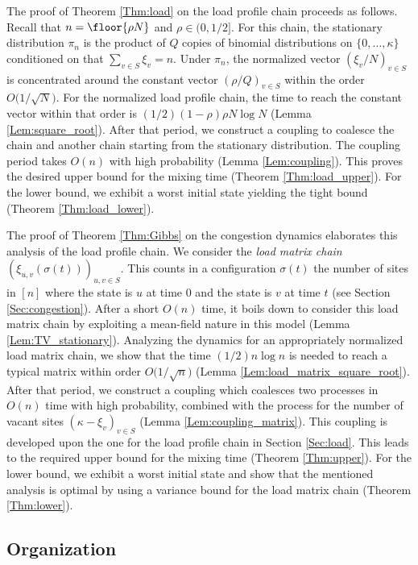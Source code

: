 \documentclass[12pt, reqno]{amsart}
\begin{document}
The proof of Theorem \ref{Thm:load} on the load profile chain proceeds as follows.
Recall that $n=\floor{\rho N}$ and $\rho \in (0, 1/2]$.
For this chain,
the stationary distribution $\pi_n$ is the product of $Q$ copies of binomial distributions on $\{0, \dots, \kappa\}$ conditioned on that $\sum_{v \in S}\xi_v=n$.
Under $\pi_n$,
the normalized vector $(\xi_v/N)_{v \in S}$ is concentrated around the constant vector $(\rho/Q)_{v \in S}$ within the order $O\big(1/\sqrt{N}\big)$.
For the normalized load profile chain,
the time to reach the constant vector within that order is $(1/2)(1-\rho)\rho N\log N$ (Lemma \ref{Lem:square_root}).
After that period,
we construct a coupling to coalesce the chain and another chain starting from the stationary distribution.
The coupling period takes $O(n)$ with high probability (Lemma \ref{Lem:coupling}).
This proves the desired upper bound for the mixing time (Theorem \ref{Thm:load_upper}).
For the lower bound,
we exhibit a worst initial state yielding the tight bound (Theorem \ref{Thm:load_lower}).


The proof of Theorem \ref{Thm:Gibbs} on the congestion dynamics elaborates this analysis of the load profile chain.
We consider the {\it load matrix chain} $(\xi_{u, v}(\sigma(t)))_{u, v \in S}$.
This counts in a configuration $\sigma(t)$ the number of sites in $[n]$ where the state is $u$ at time $0$ and the state is $v$ at time $t$ (see Section \ref{Sec:congestion}).
After a short $O(n)$ time,
it boils down to consider this load matrix chain by exploiting a mean-field nature in this model (Lemma \ref{Lem:TV_stationary}).
Analyzing the dynamics for an appropriately normalized load matrix chain,
we show that the time $(1/2)n\log n$ is needed to reach a typical matrix within order $O\big(1/\sqrt{n}\big)$ (Lemma \ref{Lem:load_matrix_square_root}).
After that period,
we construct a coupling which coalesces two processes in $O(n)$ time with high probability,
combined with the process for the number of vacant sites $(\kappa-\xi_v)_{v \in S}$ (Lemma \ref{Lem:coupling_matrix}).
This coupling is developed upon the one for the load profile chain in Section \ref{Sec:load}.
This leads to the required upper bound for the mixing time (Theorem \ref{Thm:upper}).
For the lower bound, we exhibit a worst initial state and show that the mentioned analysis is optimal by using a variance bound for the load matrix chain (Theorem \ref{Thm:lower}).

\subsection{Organization}
\end{document}
